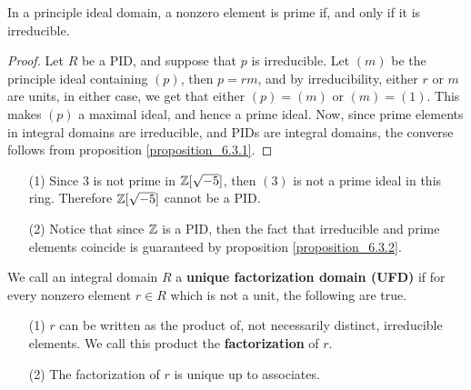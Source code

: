 \begin{proposition}\label{proposition_6.3.2}
  In a principle ideal domain, a nonzero element is prime if, and only if it
  is irreducible.
\end{proposition}
\begin{proof}
  Let $R$ be a PID, and suppose that $p$ is irreducible. Let $(m)$ be the
  principle ideal containing $(p)$, then $p=rm$, and by irreducibility, either
  $r$ or $m$ are units, in either case, we get that either $(p)=(m)$ or
  $(m)=(1)$. This makes $(p)$ a maximal ideal, and hence a prime
  ideal. Now, since prime elements in integral domains are
  irreducible, and PIDs are integral domains, the converse follows
  from proposition \ref{proposition_6.3.1}.
\end{proof}

\begin{example}\label{example_6.7}
  \begin{enumerate}
    \item[(1)] Since $3$ is not prime in  $\mathbb{Z}[\sqrt{-5}]$, then $(3)$ is not
      a prime ideal in this ring. Therefore $\mathbb{Z}[\sqrt{-5}]$ cannot be a
      PID.

    \item[(2)] Notice that since $\mathbb{Z}$ is a PID, then the fact that
      irreducible and prime elements coincide is guaranteed by proposition
      \ref{proposition_6.3.2}.
  \end{enumerate}
\end{example}

\begin{definition}
  We call an integral domain $R$ a  \textbf{unique factorization domain (UFD)}
  if for every nonzero element $r \in R$ which is not a unit, the following
  are true.
  \begin{enumerate}
    \item[(1)] $r$ can be written as the product of, not necessarily distinct,
      irreducible elements. We call this product the
      \textbf{factorization} of $r$.

    \item[(2)] The factorization of $r$ is unique up to associates.
  \end{enumerate}
\end{definition}


